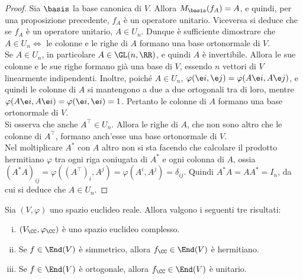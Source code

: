 \documentclass[11pt]{article}
\begin{document}
	\begin{proof}
		Sia $\basis$ la base canonica di $V$. Allora $M_\basis(f_A) = A$, e quindi, per una proposizione
		precedente, $f_A$ è un operatore unitario. Viceversa si deduce che se $f_A$ è un operatore unitario,
		$A \in U_n$. Dunque è sufficiente dimostrare che $A \in U_n \iff$ le colonne e le righe di $A$ formano una
		base ortonormale di $V$. \\
		
		\rightproof Se $A \in U_n$, in particolare $A \in \GL(n, \RR)$, e quindi $A$ è invertibile. Allora le
		sue colonne e le sue righe formano già una base di $V$, essendo $n$ vettori di $V$ linearmente indipendenti.
		Inoltre, poiché $A \in U_n$, $\varphi(\e i, \e j) = \varphi(A \e i, A \e j)$, e quindi le colonne di $A$ si mantengono a due a due ortogonali tra di loro, mentre $\varphi(A \e i, A \e i) = \varphi(\e i, \e i) = 1$.
		Pertanto le colonne di $A$ formano una base ortonormale di $V$. \\
		
		Si osserva che anche $A^\top \in U_n$. Allora le righe di $A$, che non sono altro che
		le colonne di $A^\top$, formano anch'esse una base ortonormale di $V$. \\
		
		\leftproof Nel moltiplicare $A^*$ con $A$ altro non si sta facendo che calcolare il prodotto
		hermitiano $\varphi$ tra ogni riga coniugata di $A^*$ e ogni colonna di $A$, ossia $(A^* A)_{ij} = \varphi((A^\top)_i, A^j) = \varphi(A^i, A^j) = \delta_{ij}$.
		Quindi $A^* A = A A^* = I_n$, da cui si deduce che $A \in U_n$.
	\end{proof}

	\begin{proposition}
		Sia $(V, \varphi)$ uno spazio euclideo reale. Allora valgono i seguenti tre risultati:
		
		\begin{enumerate}[(i)]
			\item $(V_\CC, \varphi_\CC)$ è uno spazio euclideo complesso.
			
			\item Se $f \in \End(V)$ è simmetrico, allora $f_\CC \in \End(V)$ è hermitiano.
			
			\item Se $f \in \End(V)$ è ortogonale, allora $f_\CC \in \End(V)$ è unitario.
		\end{enumerate}
	\end{proposition}
\end{document}
